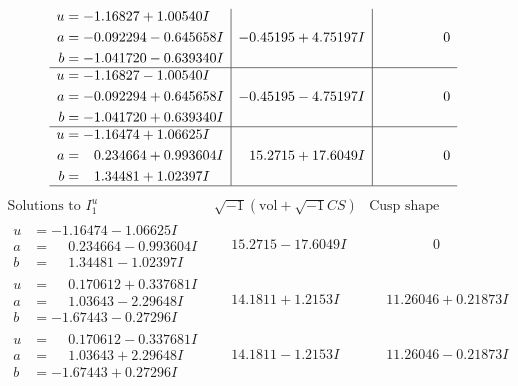 \documentclass[1p]{elsarticle_modified}
\theoremstyle{definition}
\newcommand{\I}{\sqrt{-1}}
\begin{document}
$$\begin{array}{c|c|c}
\begin{aligned}
u &= -1.16827 + 1.00540 I \\
a &= -0.092294 - 0.645658 I \\
b &= -1.041720 - 0.639340 I\end{aligned}
 & -0.45195 + 4.75197 I & \phantom{-0.000000 } 0 \\ \hline\begin{aligned}
u &= -1.16827 - 1.00540 I \\
a &= -0.092294 + 0.645658 I \\
b &= -1.041720 + 0.639340 I\end{aligned}
 & -0.45195 - 4.75197 I & \phantom{-0.000000 } 0 \\ \hline\begin{aligned}
u &= -1.16474 + 1.06625 I \\
a &= \phantom{-}0.234664 + 0.993604 I \\
b &= \phantom{-}1.34481 + 1.02397 I\end{aligned}
 & \phantom{-}15.2715 + 17.6049 I & \phantom{-0.000000 } 0\\
 \hline 
 \end{array}$$\newpage$$\begin{array}{c|c|c}  
\text{Solutions to }I^u_{1}& \I (\text{vol} + \sqrt{-1}CS) & \text{Cusp shape}\\
 \hline 
\begin{aligned}
u &= -1.16474 - 1.06625 I \\
a &= \phantom{-}0.234664 - 0.993604 I \\
b &= \phantom{-}1.34481 - 1.02397 I\end{aligned}
 & \phantom{-}15.2715 - 17.6049 I & \phantom{-0.000000 } 0 \\ \hline\begin{aligned}
u &= \phantom{-}0.170612 + 0.337681 I \\
a &= \phantom{-}1.03643 - 2.29648 I \\
b &= -1.67443 - 0.27296 I\end{aligned}
 & \phantom{-}14.1811 + 1.2153 I & \phantom{-}11.26046 + 0.21873 I \\ \hline\begin{aligned}
u &= \phantom{-}0.170612 - 0.337681 I \\
a &= \phantom{-}1.03643 + 2.29648 I \\
b &= -1.67443 + 0.27296 I\end{aligned}
 & \phantom{-}14.1811 - 1.2153 I & \phantom{-}11.26046 - 0.21873 I \\ \hline\begin{aligned}

\end{aligned}
\end{array}$$
\end{document}
